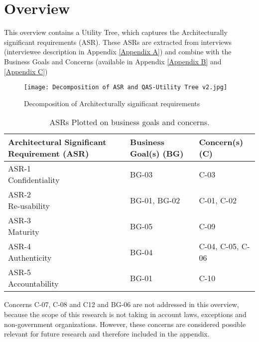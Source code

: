 \chapter{Overview}\label{s:overview}

This overview contains a Utility Tree, which captures the Architecturally significant requirements (ASR). These ASRs are extracted from interviews (interviewee description in Appendix  \ref{Appendix A}) and combine with the Business Goals and Concerns (available in Appendix \ref{Appendix B} and  \ref{Appendix C}) 

\graphicspath{ {./images/} }
\begin{figure}[t]
\texttt{[image: Decomposition of ASR and QAS-Utility Tree v2.jpg]}\\
\caption{Decomposition of Architecturally significant requirements}
\label{fig:ASR1}
\end{figure}

\begin{table}[h!]
\centering
\begin{tabular}{||l l l||} 
 \hline
 Architectural Significant Requirement (ASR) & Business Goal(s) (BG) & Concern(s) (C)\\ [0.5ex] 
 \hline\hline
 \makecell{ASR-1 \\ Confidentiality} & BG-03 & C-03 \\ 
 \hline
\makecell{ASR-2 \\ Re-usability} & BG-01, BG-02 & C-01, C-02  \\
  \hline
\makecell{ASR-3 \\ Maturity} & BG-05 &  C-09  \\
  \hline
\makecell{ASR-4 \\ Authenticity} & BG-04 & C-04, C-05, C-06 \\
  \hline
\makecell{ASR-5 \\ Accountability} & BG-01 & C-10  \\ [1ex] 
 \hline
\end{tabular}
\caption{ASRs Plotted on business goals and concerns.}
\label{ASR_BG_C}
\end{table}

Concerns C-07, C-08 and C12 and BG-06 are not addressed in this overview, because the scope of this research is not taking in account laws, exceptions and non-government organizations. However, these concerns are considered possible relevant for future research and therefore included in the appendix.


